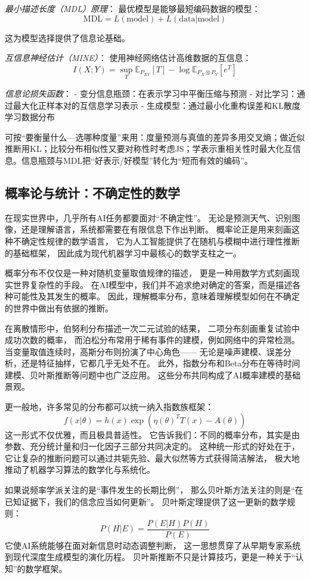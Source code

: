 \textit{最小描述长度（MDL）原理}：
最优模型是能够最短编码数据的模型：
$$\text{MDL} = L(\text{model}) + L(\text{data}|\text{model})$$

这为模型选择提供了信息论基础。

\textit{互信息神经估计（MINE）}：
使用神经网络估计高维数据的互信息：
$$I(X;Y) = \sup_{T} \mathbb{E}_{P_{XY}}[T] - \log \mathbb{E}_{P_X \otimes P_Y}[e^T]$$

\textit{信息论损失函数}：
- 变分信息瓶颈：在表示学习中平衡压缩与预测
- 对比学习：通过最大化正样本对的互信息学习表示
- 生成模型：通过最小化重构误差和KL散度学习数据分布

可按“要衡量什么—选哪种度量”来用：度量预测与真值的差异多用交叉熵；做近似推断用KL；比较分布相似性又要对称性时考虑JS；学表示重相关性时最大化互信息。信息瓶颈与MDL把“好表示/好模型”转化为“短而有效的编码”。

\subsection{概率论与统计：不确定性的数学}

在现实世界中，几乎所有AI任务都要面对“不确定性”。  
无论是预测天气、识别图像，还是理解语言，系统都需要在有限信息下作出判断。  
概率论正是用来刻画这种不确定性规律的数学语言，  
它为人工智能提供了在随机与模糊中进行理性推断的基础框架，  
因此成为现代机器学习中最核心的数学支柱之一。

概率分布不仅仅是一种对随机变量取值规律的描述，  
更是一种用数学方式刻画现实世界复杂性的手段。  
在AI模型中，我们并不追求绝对确定的答案，而是描述各种可能性及其发生的概率。  
因此，理解概率分布，意味着理解模型如何在不确定的世界中做出有依据的推断。

在离散情形中，伯努利分布描述一次二元试验的结果，  
二项分布刻画重复试验中成功次数的概率，  
而泊松分布常用于稀有事件的建模，例如网络中的异常检测。  
当变量取值连续时，高斯分布则扮演了中心角色——  
无论是噪声建模、误差分析，还是特征抽样，它都几乎无处不在。  
此外，指数分布和Beta分布在等待时间建模、贝叶斯推断等问题中也广泛应用。  
这些分布共同构成了AI概率建模的基础景观。

更一般地，许多常见的分布都可以统一纳入指数族框架：
$$f(x|\theta) = h(x)\exp(\eta(\theta)^T T(x) - A(\theta))$$
这一形式不仅优雅，而且极具普适性。  
它告诉我们：不同的概率分布，其实是由参数、充分统计量和归一化因子三部分共同决定的。  
这种统一形式的好处在于，它让复杂的推断问题可以通过共轭先验、最大似然等方式获得简洁解法，  
极大地推动了机器学习算法的数学化与系统化。

如果说频率学派关注的是“事件发生的长期比例”，  
那么贝叶斯方法关注的则是“在已知证据下，我们的信念应当如何更新”。  
贝叶斯定理提供了这一更新的数学规则：
$$P(H|E) = \frac{P(E|H)P(H)}{P(E)}$$
它使AI系统能够在面对新信息时动态调整判断，  
这一思想贯穿了从早期专家系统到现代深度生成模型的演化历程。  
贝叶斯推断不只是计算技巧，更是一种关于“认知”的数学框架。


